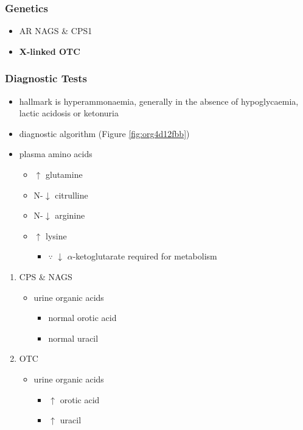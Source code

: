 \documentclass[12pt]{scrartcl}
\begin{document}
\begin{center}
\begin{center}
\subsubsection{Genetics}
\label{sec:org0568490}
\begin{itemize}
\item AR NAGS \& CPS1
\item \textbf{X-linked OTC}
\end{itemize}

\subsubsection{Diagnostic Tests}
\label{sec:org7665163}
\begin{itemize}
\item hallmark is hyperammonaemia, generally in the absence of
hypoglycaemia, lactic acidosis or ketonuria
\item diagnostic algorithm (Figure \ref{fig:org4d12fbb})
\item plasma amino acids
\begin{itemize}
\item \(\uparrow\) glutamine
\item N-\(\downarrow\) citrulline
\item N-\(\downarrow\) arginine
\item \(\uparrow\) lysine
\begin{itemize}
\item \(\because\) \(\downarrow\) \(\alpha\)-ketoglutarate required for metabolism
\end{itemize}
\end{itemize}
\end{itemize}
\begin{enumerate}
\item CPS \& NAGS
\label{sec:orga6c5f86}
\begin{itemize}
\item urine organic acids
\begin{itemize}
\item normal orotic acid
\item normal uracil
\end{itemize}
\end{itemize}
\item OTC
\label{sec:org86d3f73}
\begin{itemize}
\item urine organic acids
\begin{itemize}
\item \(\uparrow\) orotic acid
\item \(\uparrow\) uracil
\end{itemize}
\end{itemize}
\end{enumerate}



\end{center}
\end{center}
\end{document}
